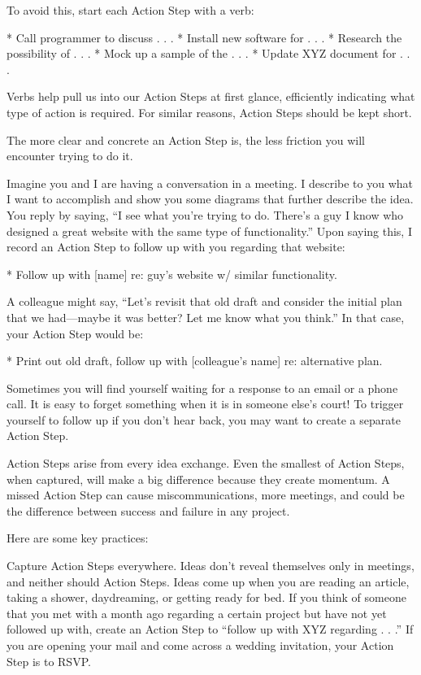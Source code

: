 To avoid this, start each Action Step with a verb:

   * Call programmer to discuss . . .
   * Install new software for . . .
   * Research the possibility of . . .
   * Mock up a sample of the . . .
   * Update XYZ document for . . .

Verbs help pull us into our Action Steps at first glance, efficiently indicating what type of action is required. For similar reasons, Action Steps should be kept short.

The more clear and concrete an Action Step is, the less friction you will
encounter trying to do it.

Imagine you and I are having a conversation in a meeting. I describe to you what I want to accomplish and show you some diagrams that further describe the idea. You reply by saying, “I see what you’re trying to do. There’s a guy I know who designed a great website with the same type of functionality.” Upon saying this, I record an Action Step to follow up with you regarding that website:

   * Follow up with [name] re: guy’s website w/ similar functionality.


A colleague might say, “Let’s revisit that old draft and consider the initial plan that we had—maybe it was better? Let me know what you
think.” In that case, your Action Step would be:

   * Print out old draft, follow up with [colleague’s name] re: alternative plan.

Sometimes you will find yourself waiting for a response to an email or a phone call. It is easy to forget something when it is in someone else’s court! To trigger yourself to follow up if you don’t hear back, you may want to create a separate Action Step.

Action Steps arise from every idea exchange. Even the smallest of Action Steps, when captured, will make a big difference because they create momentum. A missed Action Step can cause miscommunications, more meetings, and could be the difference between success and failure in any project.

Here are some key practices:

Capture Action Steps everywhere. Ideas don’t reveal themselves only in meetings, and neither should Action Steps. Ideas come up when you are reading an article, taking a shower, daydreaming, or getting ready for bed. If you think of someone that you met with a month ago regarding a certain project but have not yet followed up with, create an Action Step to “follow up with XYZ regarding . . .” If you are opening your mail and come across a wedding invitation, your Action Step is to RSVP.

